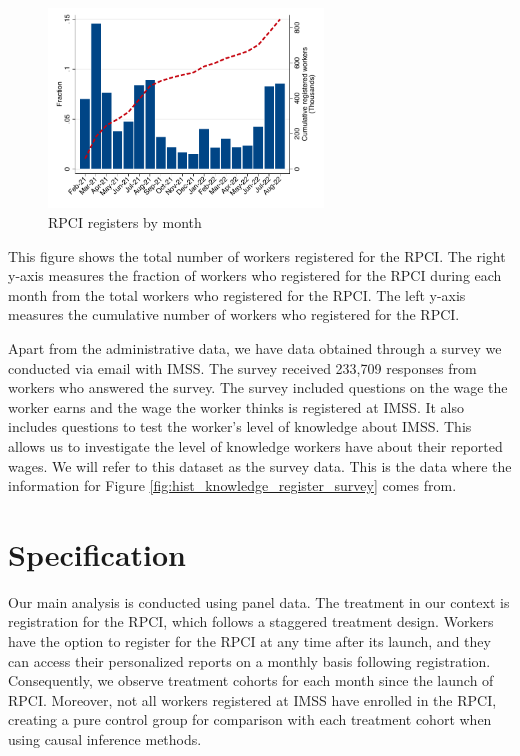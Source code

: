 \documentclass[10pt, oneside]{book}
\begin{document}
\begin{figure}[H]
    \caption{RPCI registers by month}
    \label{hist_download}
    \begin{center}
    \includegraphics[width=0.65\textwidth]{04_Figures/muestra_1porciento/hist_download_month.pdf}
    \end{center}
\end{figure}
\scriptsize{
\noindent This figure shows the total number of workers registered for the RPCI. The right y-axis measures the fraction of workers who registered for the RPCI during each month from the total workers who registered for the RPCI. The left y-axis measures the cumulative number of workers who registered for the RPCI.
} \\

\normalsize

Apart from the administrative data, we have data obtained through a survey we conducted via email with IMSS. The survey received 233,709 responses from workers who answered the survey. The survey included questions on the wage the worker earns and the wage the worker thinks is registered at IMSS. It also includes questions to test the worker's level of knowledge about IMSS. This allows us to investigate the level of knowledge workers have about their reported wages. We will refer to this dataset as the survey data. This is the data where the information for Figure \ref{fig:hist_knowledge_register_survey} comes from.

\chapter{Specification} \label{specification}

Our main analysis is conducted using panel data. The treatment in our context is registration for the RPCI, which follows a staggered treatment design. Workers have the option to register for the RPCI at any time after its launch, and they can access their personalized reports on a monthly basis following registration. Consequently, we observe treatment cohorts for each month since the launch of RPCI. Moreover, not all workers registered at IMSS have enrolled in the RPCI, creating a pure control group for comparison with each treatment cohort when using causal inference methods. \\
\end{document}
